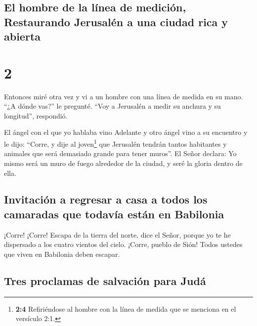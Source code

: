 \hypertarget{el-hombre-de-la-luxednea-de-mediciuxf3n-restaurando-jerusaluxe9n-a-una-ciudad-rica-y-abierta}{%
\subsection{El hombre de la línea de medición, Restaurando Jerusalén a
una ciudad rica y
abierta}\label{el-hombre-de-la-luxednea-de-mediciuxf3n-restaurando-jerusaluxe9n-a-una-ciudad-rica-y-abierta}}

\hypertarget{section-1}{%
\section{2}\label{section-1}}

 Entonces miré otra vez y vi a un hombre con una línea de
medida en su mano.  ``¿A dónde vas?'' le pregunté. ``Voy a
Jerusalén a medir su anchura y su longitud'', respondió.

 El ángel con el que yo hablaba vino Adelante y otro ángel
vino a su encuentro  y le dijo: ``Corre, y dije al
joven\footnote{\textbf{2:4} Refiriéndose al hombre con la línea de
  medida que se menciona en el versículo 2:1.} que Jerusalén tendrán
tantos habitantes y animales que será demasiado grande para tener
muros''.  El Señor declara: Yo mismo será un muro de fuego
alrededor de la ciudad, y seré la gloria dentro de ella.

\hypertarget{invitaciuxf3n-a-regresar-a-casa-a-todos-los-camaradas-que-todavuxeda-estuxe1n-en-babilonia}{%
\subsection{Invitación a regresar a casa a todos los camaradas que
todavía están en
Babilonia}\label{invitaciuxf3n-a-regresar-a-casa-a-todos-los-camaradas-que-todavuxeda-estuxe1n-en-babilonia}}

 ¡Corre! ¡Corre! Escapa de la tierra del norte, dice el
Señor, porque yo te he dispersado a los cuatro vientos del cielo.
 ¡Corre, pueblo de Sión! Todos ustedes que viven en
Babilonia deben escapar.

\hypertarget{tres-proclamas-de-salvaciuxf3n-para-juduxe1}{%
\subsection{Tres proclamas de salvación para
Judá}\label{tres-proclamas-de-salvaciuxf3n-para-juduxe1}}

